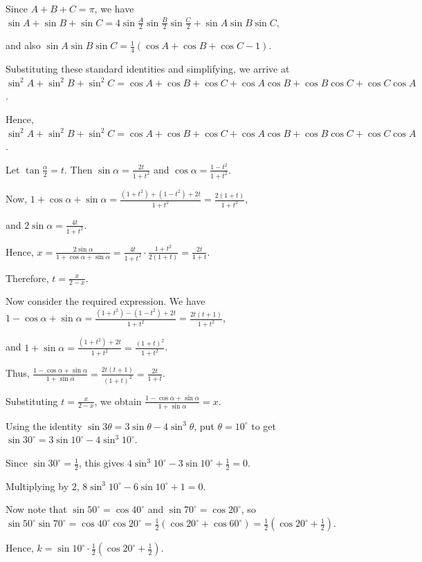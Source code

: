   Since $A+B+C=\pi$, we have
  $\sin A + \sin B + \sin C = 4 \sin\frac A2 \sin\frac B2 \sin\frac C2 + \sin A \sin B \sin C$,

  and also
  $\sin A \sin B \sin C = \frac{1}{4}(\cos A + \cos B + \cos C - 1)$.

  Substituting these standard identities and simplifying, we arrive at
  $\sin^2 A + \sin^2 B + \sin^2 C
  = \cos A + \cos B + \cos C
  + \cos A \cos B + \cos B \cos C + \cos C \cos A$.

  Hence,
  $\sin^2A + \sin^2B + \sin^2C
  = \cos A + \cos B + \cos C + \cos A\cos B + \cos B\cos C + \cos C\cos A$.
\item Let $\tan\frac{\alpha}{2}=t$. Then $\sin\alpha=\frac{2t}{1+t^2}$ and $\cos\alpha=\frac{1-t^2}{1+t^2}$.

  Now, $1+\cos\alpha+\sin\alpha = \frac{(1+t^2)+(1-t^2)+2t}{1+t^2} = \frac{2(1+t)}{1+t^2}$,

  and $2\sin\alpha=\frac{4t}{1+t^2}$.

  Hence, $x = \frac{2\sin\alpha}{1+\cos\alpha+\sin\alpha} = \frac{4t}{1+t^2}\cdot\frac{1+t^2}{2(1+t)} = \frac{2t}{1+t}$.

  Therefore, $t = \frac{x}{2-x}$.

  Now consider the required expression. We have $1-\cos\alpha+\sin\alpha = \frac{(1+t^2)-(1-t^2)+2t}{1+t^2}
  = \frac{2t(t+1)}{1+t^2}$,

  and $1+\sin\alpha = \frac{(1+t^2)+2t}{1+t^2} = \frac{(1+t)^2}{1+t^2}$.

  Thus, $\frac{1-\cos\alpha+\sin\alpha}{1+\sin\alpha} = \frac{2t(t+1)}{(1+t)^2} = \frac{2t}{1+t}$.

  Substituting $t=\frac{x}{2-x}$, we obtain $\frac{1-\cos\alpha+\sin\alpha}{1+\sin\alpha} = x$.
\item Using the identity $\sin3\theta=3\sin\theta-4\sin^3\theta$, put $\theta=10^\circ$ to get
  $\sin30^\circ=3\sin10^\circ-4\sin^3 10^\circ$.

  Since $\sin30^\circ=\frac12$, this gives $4\sin^3 10^\circ-3\sin10^\circ+\frac12=0$.

  Multiplying by $2$, $8\sin^3 10^\circ-6\sin10^\circ+1=0$.

  Now note that $\sin50^\circ=\cos40^\circ$ and $\sin70^\circ=\cos20^\circ$, so $\sin50^\circ\sin70^\circ=\cos40^\circ\cos20^\circ
  = \frac12(\cos20^\circ+\cos60^\circ) = \frac12\left(\cos20^\circ+\frac12\right)$.

  Hence, $k=\sin10^\circ\cdot\frac12\left(\cos20^\circ+\frac12\right)$.

